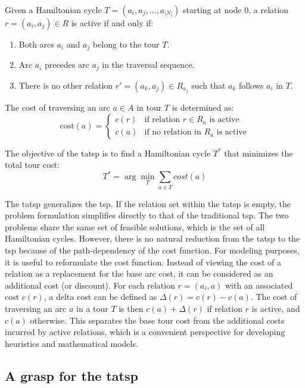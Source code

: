 \documentclass[twocolumn]{article} %
\begin{document}
Given a Hamiltonian cycle $T = (a_i, a_j, \ldots, a_{|N|})$ starting at node $0$, a relation $r = (a_i, a_j) \in R$ is active if and only if:
\begin{enumerate}
\item Both arcs $a_i$ and $a_j$ belong to the tour $T$.
\item Arc $a_i$ precedes arc $a_j$ in the traversal sequence.
\item There is no other relation $r' = (a_k, a_j) \in R_{a_j}$ such that $a_k$ follows $a_i$ in $T$.
\end{enumerate}

The cost of traversing an arc $a \in A$ in tour $T$ is determined as:
\begin{equation}
\text{cost}(a) = \begin{cases}
c(r) & \text{if relation } r \in R_a \text{ is active} \\
c(a) & \text{if no relation in } R_a \text{ is active}
\end{cases}
\end{equation}

The objective of the \gls{tatsp} is to find a Hamiltonian cycle $T^*$ that minimizes the total tour cost:
\begin{equation}
T^* = \arg\min_{T} \sum_{a \in T} cost(a)
\end{equation}

The \gls{tatsp} generalizes the \gls{tsp}. If the relation set within the \gls{tatsp} is empty, 
the problem formulation simplifies directly to that of the traditional \gls{tsp}.
The two problems share the same set of feasible solutions, which is the set of all Hamiltonian cycles.
However, there is no natural reduction from the \gls{tatsp} to the \gls{tsp} because of the path-dependency of the cost function.
For modeling purposes, it is useful to reformulate the cost function. Instead of viewing the cost of a relation as a replacement for the base arc cost, it can be considered as an additional cost (or discount). For each relation $r = (a_i, a)$ with an associated cost $c(r)$, a delta cost can be defined as $\Delta(r) = c(r) - c(a)$. The cost of traversing an arc $a$ in a tour $T$ is then $c(a) + \Delta(r)$ if relation $r$ is active, and $c(a)$ otherwise. This separates the base tour cost from the additional costs incurred by active relations, which is a convenient perspective for developing heuristics and mathematical models.

\subsection{A \gls{grasp} for the \gls{tatsp}}
\end{document}
